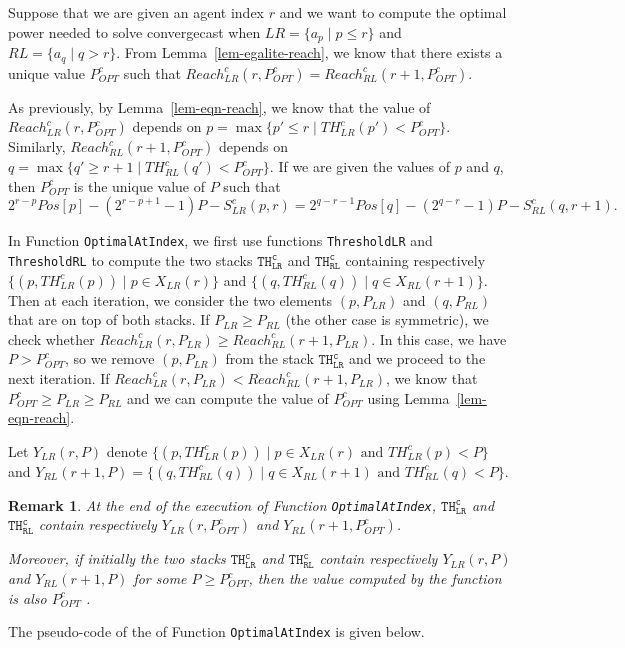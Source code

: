 \documentclass{article}
\newtheorem{remark}{Remark}
\newcommand\rclr{Reach_{LR}^c\xspace}
\newcommand\rcrl{Reach_{RL}^c\xspace}
\newcommand\tclr{TH_{LR}^c\xspace}
\newcommand\tcrl{TH_{RL}^c\xspace}
\newcommand\sclr{S_{LR}^c\xspace}
\newcommand\scrl{S_{RL}^c\xspace}
\newcommand\CompThLR{\mbox{{\tt ThresholdLR}}\xspace}
\newcommand\CompOptimalPos{{{\tt Optimal\-At\-Index}}\xspace}
\newcommand\CompThRL{\mbox{{\tt ThresholdRL}}\xspace}
\newcommand\convergecast{convergecast\xspace}
\begin{document}
Suppose that we are given an agent index $r$ and we want to
compute the optimal power needed to solve {\convergecast} when $LR =
\{a_p \mid p \leq r\}$ and $RL = \{a_q \mid q > r\}$. From
Lemma~\ref{lem-egalite-reach}, we know that there exists a unique value
$P_{OPT}^c$ such that $\rclr(r,P_{OPT}^c) = \rcrl(r+1,P_{OPT}^c)$.

As previously, by Lemma~\ref{lem-eqn-reach}, we know that the value
of $\rclr(r,P_{OPT}^c)$ depends on $p = \max\{p' \leq r \mid
\tclr(p') < P_{OPT}^c\}$. Similarly, $\rcrl(r+1,P_{OPT}^c)$ depends
on $q = \max\{q' \geq r+1 \mid \tcrl(q') < P_{OPT}^c\}$.  If we are
given the values of $p$ and $q$, then $P_{OPT}^c$ is the unique value of $P$
such that
$$ 2^{r-p}Pos[p] - (2^{r-p+1}-1)P - \sclr(p,r) = 2^{q-r-1}Pos[q] -
          (2^{q-r}-1)P - \scrl(q,r+1).$$ 

In Function \CompOptimalPos, we first use functions \CompThLR and \CompThRL to
compute the two stacks $\mathtt{\tclr}$ and $\mathtt{\tcrl}$
containing respectively $\{(p,\tclr(p)) \mid p \in X_{LR}(r)\}$ and
$\{(q,\tcrl(q)) \mid q \in X_{RL}(r+1)\}$.  Then at each iteration,
we consider the two elements $(p,P_{LR})$ and $(q, P_{RL})$ that are
on top of both stacks. If $P_{LR} \geq P_{RL}$ (the other case is
symmetric), we check whether $\rclr(r,P_{LR}) \geq
\rcrl(r+1,P_{LR})$.  In this case, we have $P > P_{OPT}^c$, so we
remove $(p,P_{LR})$ from the stack $\mathtt{\tclr}$ and we proceed
to the next iteration.  If $\rclr(r,P_{LR}) <
\rcrl(r+1,P_{LR})$, we know that $P_{OPT}^c \geq P_{LR} \geq
P_{RL}$ and we can compute the value of $P_{OPT}^c$ using
Lemma~\ref{lem-eqn-reach}.




Let $Y_{LR}(r,P)$ denote $ \{(p,\tclr(p)) \mid p \in X_{LR}(r)
\mbox{ and } \tclr(p) < P\}$ and $Y_{RL}(r+1,P) = \{(q,\tcrl(q))
\mid q \in X_{RL}(r+1) \mbox{ and } \tcrl(q) < P\}$.

\begin{remark}\label{rem-atpos}
At the end of the execution of Function \CompOptimalPos,
$\mathtt{\tclr}$ and $\mathtt{\tcrl}$ contain respectively
$Y_{LR}(r,P_{OPT}^c)$ and $Y_{RL}(r+1,P_{OPT}^c)$.

Moreover, if initially the two stacks $\mathtt{\tclr}$ and
$\mathtt{\tcrl}$ contain respectively $Y_{LR}(r,P)$ and
$Y_{RL}(r+1,P)$ for some $P \geq P_{OPT}^c$, then the value computed by
the function is also $P_{OPT}^c$ .
\end{remark}

The pseudo-code of the of Function \CompOptimalPos is given below. 
\end{document}
